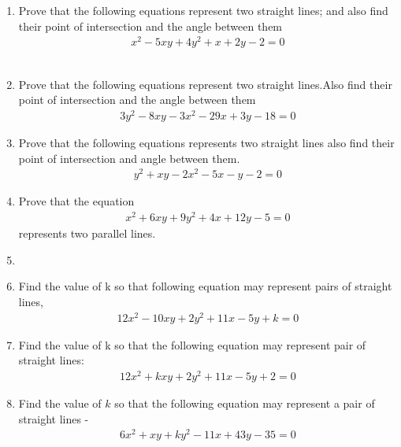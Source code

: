 \renewcommand{\theequation}{\theenumi}
\renewcommand{\thefigure}{\theenumi}
\begin{enumerate}[label=\thesubsection.\arabic*.,ref=\thesubsection.\theenumi]
%
\item Prove that the following equations represent two straight lines; and also find their point of intersection and the angle between them
\begin{align}\nonumber
    x^2-5xy+4y^2+x+2y-2=0
\end{align}
\\
\solution

\item Prove that the following equations represent two straight lines.Also find their point of intersection and the angle between them
\begin{align}
 3y^2-8xy-3x^2-29x+3y-18=0   
\label{eq:solutions/13/3/1}
\end{align}
\solution

\item Prove that the following equations represents two straight lines also find their point of intersection and angle between them.
\begin{align}
y^2+xy-2x^2-5x-y-2=0
\end{align}
%
\solution

\item Prove that the equation
\begin{align} 
    x^{2}+6xy+9y^{2}+4x+12y-5=0 \label{eq:solutions/13/5/eq:0}
\end{align}
represents two parallel lines.

\solution

\item 
%
\solution

%
\item Find the value of k so that following equation may represent pairs of straight lines,
\begin{align}
12x^2-10xy+2y^2+11x-5y+k=0
\label{eq:solutions/13/7/1}
\end{align}
%
\solution

\item Find the value of k so that the following equation may represent pair of straight lines: 
\begin{align}
    12x^2+kxy+2y^2+11x-5y+2=0\label{eq:solutions/13/8/1.1}
\end{align}
\solution

%
\item Find the value of $k$ so that the following equation may represent a pair of straight lines - 
\begin{align}
6x^2 +xy+ky^2-11x+43y-35 = 0 \label{eq:solutions/13/94}
\end{align}
\solution



\end{enumerate}
